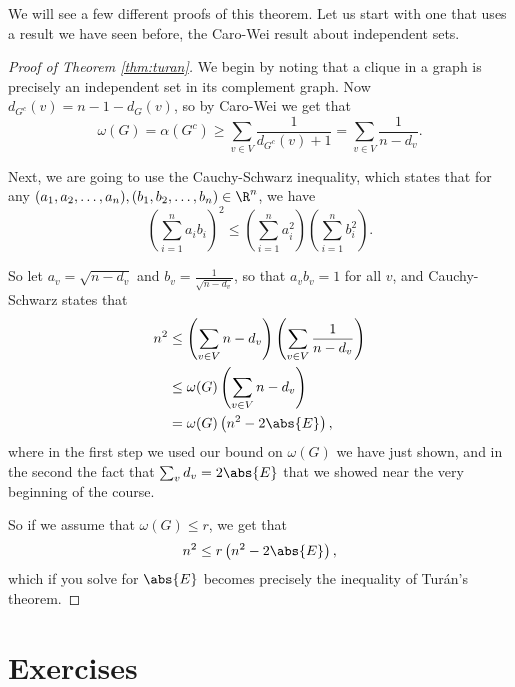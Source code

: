 \documentclass[nobib]{tufte-handout}
\begin{document}
We will see a few different proofs of this theorem. Let us start with one that uses a result we have seen before, the Caro-Wei result about independent sets.

\begin{proof}[Proof of Theorem \ref{thm:turan}]
    We begin by noting that a clique in a graph is precisely an independent set in its complement graph. Now $d_{G^c}(v) = n - 1 - d_{G}(v)$, so by Caro-Wei we get that
    $$\omega(G) = \alpha\left(G^c\right) \geq \sum_{v \in V} \frac{1}{d_{G^c}(v) + 1} = \sum_{v \in V} \frac{1}{n - d_v}.$$

    Next, we are going to use the Cauchy-Schwarz inequality, which states that for any $(a_1, a_2,\ldots, a_n), (b_1, b_2, \ldots, b_n) \in \R^n$, we have
    $$\left(\sum_{i=1}^{n} a_i b_i\right)^2 \leq \left(\sum_{i=1}^{n} a_i^2\right)\left(\sum_{i=1}^{n} b_i^2\right).$$

    So let $a_v = \sqrt{n - d_v}$ and $b_v = \frac{1}{\sqrt{n - d_v}}$, so that $a_v b_v = 1$ for all $v$, and Cauchy-Schwarz states that
    \begin{align*}
        n^2 &\leq \left(\sum_{v \in V} n - d_v\right)\left(\sum_{v \in V} \frac{1}{n - d_v}\right)\\
        &\leq \omega(G)\left(\sum_{v \in V} n - d_v\right)\\
        &= \omega(G)\left(n^2 - 2\abs{E}\right),
    \end{align*}
    where in the first step we used our bound on $\omega(G)$ we have just shown, and in the second the fact that $\sum_v d_v = 2\abs{E}$ that we showed near the very beginning of the course.

    So if we assume that $\omega(G) \leq r$, we get that
    $$n^2 \leq r\left(n^2 - 2\abs{E}\right),$$
    which if you solve for $\abs{E}$ becomes precisely the inequality of Turán's theorem.
\end{proof}

\section{Exercises}


%
%
\end{document}
